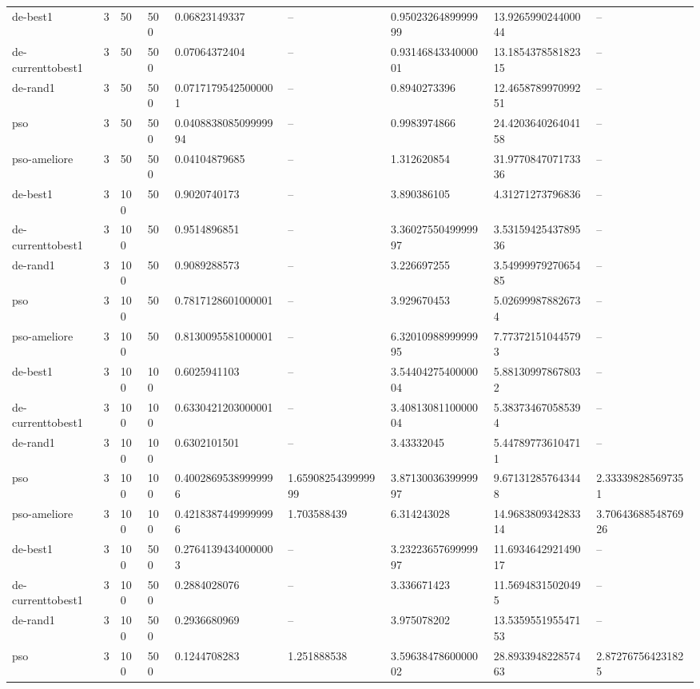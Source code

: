 \begin{table}[t]
\begin{tabular}{lllllllll}
de-best1 & 3 & 50 & 500 & 0.06823149337 & -- & 0.9502326489999999 & 13.926599024400044 & -- \\
de-currenttobest1 & 3 & 50 & 500 & 0.07064372404 & -- & 0.9314684334000001 & 13.185437858182315 & -- \\
de-rand1 & 3 & 50 & 500 & 0.07171795425000001 & -- & 0.8940273396 & 12.465878997099251 & -- \\
pso & 3 & 50 & 500 & 0.040883808509999994 & -- & 0.9983974866 & 24.420364026404158 & -- \\
pso-ameliore & 3 & 50 & 500 & 0.04104879685 & -- & 1.312620854 & 31.977084707173336 & -- \\
de-best1 & 3 & 100 & 50 & 0.9020740173 & -- & 3.890386105 & 4.31271273796836 & -- \\
de-currenttobest1 & 3 & 100 & 50 & 0.9514896851 & -- & 3.3602755049999997 & 3.5315942543789536 & -- \\
de-rand1 & 3 & 100 & 50 & 0.9089288573 & -- & 3.226697255 & 3.5499997927065485 & -- \\
pso & 3 & 100 & 50 & 0.7817128601000001 & -- & 3.929670453 & 5.026999878826734 & -- \\
pso-ameliore & 3 & 100 & 50 & 0.8130095581000001 & -- & 6.3201098899999995 & 7.773721510445793 & -- \\
de-best1 & 3 & 100 & 100 & 0.6025941103 & -- & 3.5440427540000004 & 5.881309978678032 & -- \\
de-currenttobest1 & 3 & 100 & 100 & 0.6330421203000001 & -- & 3.4081308110000004 & 5.383734670585394 & -- \\
de-rand1 & 3 & 100 & 100 & 0.6302101501 & -- & 3.43332045 & 5.447897736104711 & -- \\
pso & 3 & 100 & 100 & 0.40028695389999996 & 1.6590825439999999 & 3.8713003639999997 & 9.671312857643448 & 2.333398285697351 \\
pso-ameliore & 3 & 100 & 100 & 0.42183874499999996 & 1.703588439 & 6.314243028 & 14.968380934283314 & 3.7064368854876926 \\
de-best1 & 3 & 100 & 500 & 0.27641394340000003 & -- & 3.2322365769999997 & 11.693464292149017 & -- \\
de-currenttobest1 & 3 & 100 & 500 & 0.2884028076 & -- & 3.336671423 & 11.56948315020495 & -- \\
de-rand1 & 3 & 100 & 500 & 0.2936680969 & -- & 3.975078202 & 13.535955195547153 & -- \\
pso & 3 & 100 & 500 & 0.1244708283 & 1.251888538 & 3.5963847860000002 & 28.893394822857463 & 2.872767564231825 \\

\end{tabular}
\end{table}
